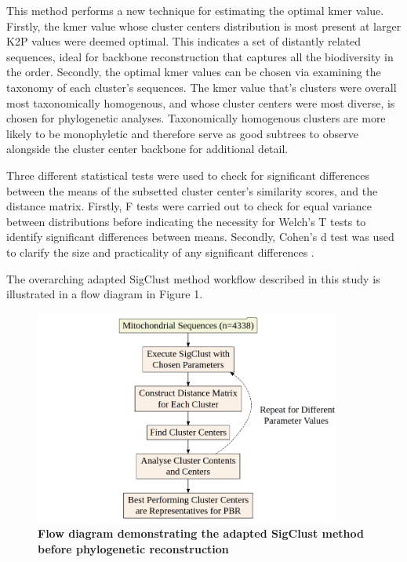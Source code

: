 \documentclass[12pt]{article}
\begin{document}
  This method performs a new technique for estimating the optimal kmer value. Firstly, the kmer value whose cluster centers distribution is most present at larger K2P values were deemed optimal. This indicates a set of distantly related sequences, ideal for backbone reconstruction that captures all the biodiversity in the order. Secondly, the optimal kmer values can be chosen via examining the taxonomy of each cluster's sequences. The kmer value that's clusters were overall most taxonomically homogenous, and whose cluster centers were most diverse, is chosen for phylogenetic analyses. Taxonomically homogenous clusters are more likely to be monophyletic and therefore serve as good subtrees to observe alongside the cluster center backbone for additional detail.

  Three different statistical tests were used to check for significant differences between the means of the subsetted cluster center's similarity scores, and the distance matrix. Firstly, F tests were carried out to check for equal variance between distributions before indicating the necessity for Welch's T tests to identify significant differences between means. Secondly, Cohen's d test was used to clarify the size and practicality of any significant differences \cite{Aoki2020}.

  The overarching adapted SigClust method workflow described in this study is illustrated in a flow diagram in Figure 1.

  \begin{figure}[H]
    \centering
    \includegraphics[width=0.9\textwidth]{flowchart.png}
    \captionsetup{margin=0.75cm}
      \caption{\textbf{\small Flow diagram demonstrating the adapted SigClust method before phylogenetic reconstruction}}
  \end{figure}
\end{document}
